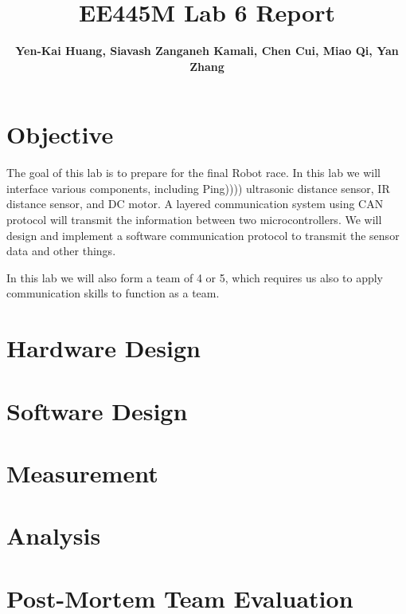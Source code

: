 \documentclass[a4paper]{article}
\begin{document}
\title{EE445M Lab 6 Report}
\author{\bfseries Yen-Kai Huang, Siavash Zanganeh Kamali, Chen Cui, Miao Qi, Yan Zhang}
\maketitle

\section{Objective} The goal of this lab is to prepare for the final Robot race. In this lab we will interface various
components, including Ping)))) ultrasonic distance sensor, IR distance sensor, and DC motor. A layered communication system
using CAN protocol will transmit the information between two microcontrollers. We will design and implement a software
communication protocol to transmit the sensor data and other things.

In this lab we will also form a team of 4 or 5, which requires us also to apply communication skills to function as a team.

\section{Hardware Design}

\section{Software Design} 

\section{Measurement}

\section{Analysis}

\section{Post-Mortem Team Evaluation}
\end{document}
